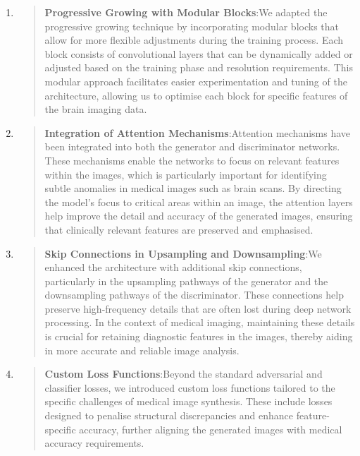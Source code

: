 \documentclass[
]{article}
\begin{document}
\begin{enumerate}
\def\labelenumi{\arabic{enumi}.}
\item
  \begin{quote}
  \textbf{Progressive Growing with Modular Blocks}:We adapted the
  progressive growing technique by incorporating modular blocks that
  allow for more flexible adjustments during the training process. Each
  block consists of convolutional layers that can be dynamically added
  or adjusted based on the training phase and resolution requirements.
  This modular approach facilitates easier experimentation and tuning of
  the architecture, allowing us to optimise each block for specific
  features of the brain imaging data.
  \end{quote}
\item
  \begin{quote}
  \textbf{Integration of Attention Mechanisms}:Attention mechanisms have
  been integrated into both the generator and discriminator networks.
  These mechanisms enable the networks to focus on relevant features
  within the images, which is particularly important for identifying
  subtle anomalies in medical images such as brain scans. By directing
  the model's focus to critical areas within an image, the attention
  layers help improve the detail and accuracy of the generated images,
  ensuring that clinically relevant features are preserved and
  emphasised.
  \end{quote}
\item
  \begin{quote}
  \textbf{Skip Connections in Upsampling and Downsampling}:We enhanced
  the architecture with additional skip connections, particularly in the
  upsampling pathways of the generator and the downsampling pathways of
  the discriminator. These connections help preserve high-frequency
  details that are often lost during deep network processing. In the
  context of medical imaging, maintaining these details is crucial for
  retaining diagnostic features in the images, thereby aiding in more
  accurate and reliable image analysis.
  \end{quote}
\item
  \begin{quote}
  \textbf{Custom Loss Functions}:Beyond the standard adversarial and
  classifier losses, we introduced custom loss functions tailored to the
  specific challenges of medical image synthesis. These include losses
  designed to penalise structural discrepancies and enhance
  feature-specific accuracy, further aligning the generated images with
  medical accuracy requirements.
  \end{quote}
\end{enumerate}
\end{document}

